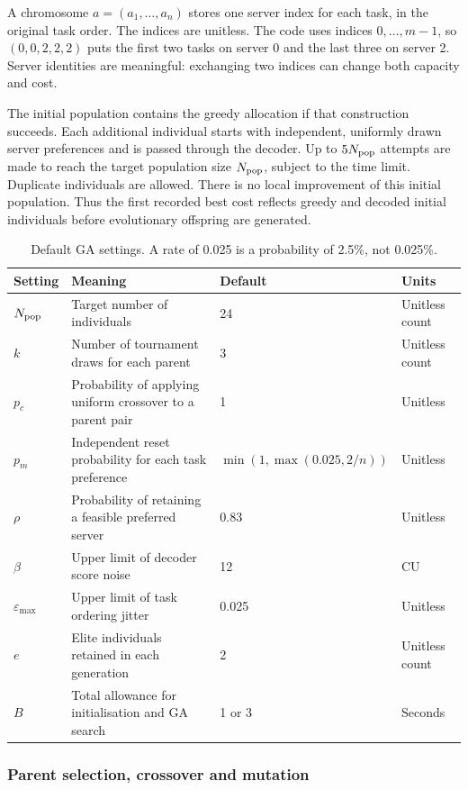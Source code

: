 \documentclass[10pt,a4paper]{article}
\begin{document}
A chromosome $a=(a_1,\ldots,a_n)$ stores one server index for each task, in
the original task order. The indices are unitless. The code uses indices
$0,\ldots,m-1$, so $(0,0,2,2,2)$ puts the first two tasks on server 0 and the
last three on server 2. Server identities are meaningful: exchanging two
indices can change both capacity and cost.

The initial population contains the greedy allocation if that construction
succeeds. Each additional individual starts with independent, uniformly drawn
server preferences and is passed through the decoder. Up to $5N_{\rm pop}$
attempts are made to reach the target population size $N_{\rm pop}$, subject to
the time limit. Duplicate individuals are allowed. There is no local improvement
of this initial population. Thus the first recorded best cost reflects greedy
and decoded initial individuals before evolutionary offspring are generated.

\begin{table}[htbp]
\centering
\caption{Default GA settings. A rate of 0.025 is a probability of 2.5\%, not 0.025\%.}
\label{tab:ga-settings}
\small
\begin{tabularx}{\textwidth}{@{}lXll@{}}
\toprule
Setting & Meaning & Default & Units \\
\midrule
$N_{\rm pop}$ & Target number of individuals & 24 & Unitless count \\
$k$ & Number of tournament draws for each parent & 3 & Unitless count \\
$p_c$ & Probability of applying uniform crossover to a parent pair & 1 & Unitless \\
$p_m$ & Independent reset probability for each task preference & $\min(1,\max(0.025,2/n))$ & Unitless \\
$\rho$ & Probability of retaining a feasible preferred server & 0.83 & Unitless \\
$\beta$ & Upper limit of decoder score noise & 12 & CU \\
$\varepsilon_{\max}$ & Upper limit of task ordering jitter & 0.025 & Unitless \\
$e$ & Elite individuals retained in each generation & 2 & Unitless count \\
$B$ & Total allowance for initialisation and GA search & 1 or 3 & Seconds \\
\bottomrule
\end{tabularx}
\end{table}

\subsubsection{Parent selection, crossover and mutation}
\end{document}
